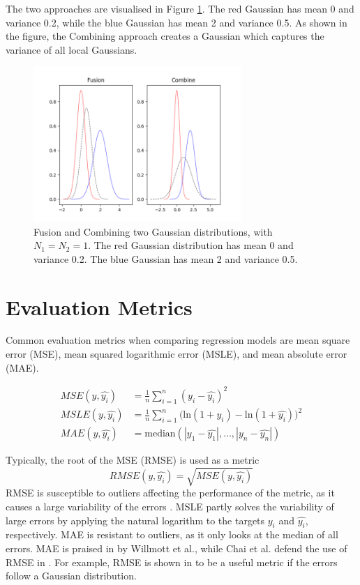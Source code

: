 The two approaches are visualised in Figure \ref{fig:aggregation}.
The red Gaussian has mean 0 and variance 0.2, while the blue Gaussian has mean 2 and variance 0.5.
As shown in the figure, the Combining approach creates a Gaussian which captures the variance of all local Gaussians.
\begin{figure} [h!]
    \centering
    \includegraphics[width=0.7\textwidth]{figures/aggregate_test}
    \caption[Fusion and Combining two Gaussian distributions]
    {\small Fusion and Combining two Gaussian distributions, with $N_1 = N_2 = 1$.
    The red Gaussian distribution has mean 0 and variance 0.2. 
    The blue Gaussian has mean 2 and variance 0.5.}
    \label{fig:aggregation}
\end{figure}


\section{Evaluation Metrics}
Common evaluation metrics when comparing regression models are mean square error (MSE), mean squared logarithmic error (MSLE), and mean absolute error (MAE).

\begin{align}
    MSE(y, \hat{y_i}) &= \frac{1}{n} \sum_{i=1}^{n} (y_i - \hat{y_i})^2 \label{eq:rmse} \\
    MSLE(y, \hat{y_i}) &= \frac{1}{n} \sum_{i=1}^{n} \big( \textrm{ln}(1+y_i) - \textrm{ln}(1+\hat{y_i}) \big)^2 \label{eq:msle} \\
    MAE(y, \hat{y_i}) &= \textrm{median}(|y_1-\hat{y_1}|, \ldots, |y_n-\hat{y_n}|)\label{eq:mae}
\end{align}

Typically, the root of the MSE (RMSE) is used as a metric
\begin{equation}
    RMSE(y, \hat{y_i}) = \sqrt{MSE(y, \hat{y_i})}
\end{equation}
RMSE is susceptible to outliers affecting the performance of the metric, as it causes a large variability of the errors \cite{Willmott2005}.
MSLE partly solves the variability of large errors by applying the natural logarithm to the targets $y_i$ and $\hat{y_i}$, respectively.
MAE is resistant to outliers, as it only looks at the median of all errors.
MAE is praised in \cite{Willmott2005} by Willmott et al., while Chai et al. defend the use of RMSE in \cite{Chai2014}.
For example, RMSE is shown in \cite{Chai2014} to be a useful metric if the errors follow a Gaussian distribution.

